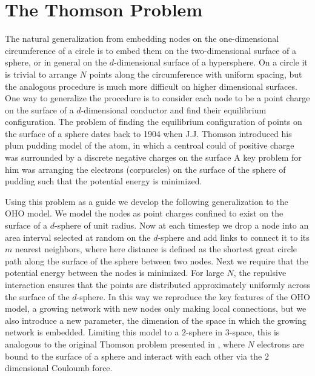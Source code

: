 \documentclass[aps,pre,reprint,superscriptaddress,amsmath,amssymb,nofootinbib]{revtex4-1}
\begin{document}
\section{The Thomson Problem}
The natural generalization from embedding nodes on the one-dimensional circumference of a circle is to embed them on the two-dimensional surface of a sphere, or in general on the $d$-dimensional surface of a hypersphere.
On a circle it is trivial to arrange $N$ points along the circumference with uniform spacing, but the analogous procedure is much more difficult on higher dimensional surfaces.
One way to generalize the procedure is to consider each node to be a point charge on the surface of a $d$-dimensional conductor and find their equilibrium configuration. 
The problem of finding the equilibrium configuration of points on the surface of a sphere dates back to 1904 when J.J. Thomson introduced his plum pudding model of the atom, in which a centroal could of positive charge was surrounded by a discrete negative charges on the surface \cite{thomson1904}
A key problem for him was arranging the electrons (corpuscles) on the surface of the sphere of pudding such that the potential energy is minimized.

Using this problem as a guide we develop the following generalization to the OHO model.
We model the nodes as point charges confined to exist on the surface of a $d$-sphere of unit radius.
Now at each timestep we drop a node into an area interval selected at random on the $d$-sphere and add links to connect it to its $m$ nearest neighbors, where here distance is defined as the shortest great circle path along the surface of the sphere between two nodes.
Next we require that the potential energy between the nodes is minimized.
For large $N$, the repulsive interaction ensures that the points are distributed approximately uniformly across the surface of the $d$-sphere.
In this way we reproduce the key features of the OHO model, a growing network with new nodes only making local connections, but we also introduce a new parameter, the dimension of the space in which the growing network is embedded.
Limiting this model to a $2$-sphere in $3$-space, this is analogous to the original Thomson problem presented in \cite{thomson1904}, where $N$ electrons are bound to the surface of a sphere and interact with each other via the $2$ dimensional Couloumb force.
\end{document}
